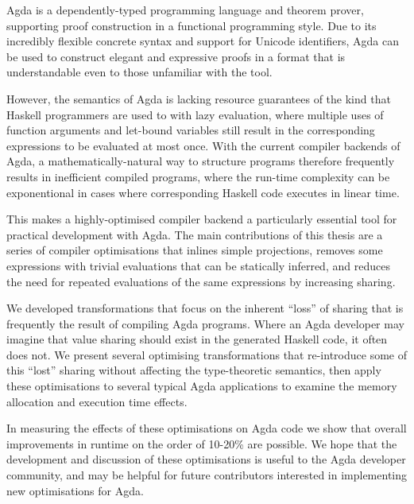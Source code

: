 Agda is a dependently-typed programming language and theorem prover,
supporting proof construction in a functional programming style.
Due to its incredibly flexible concrete syntax and support for Unicode
identifiers, Agda can be used to construct elegant and expressive
proofs in a format that is understandable even to those unfamiliar
with the tool.

However, the semantics of Agda is lacking resource guarantees
of the kind that Haskell programmers are used to with lazy evaluation,
where multiple uses of function arguments and let-bound variables
still result in the corresponding expressions to be evaluated at most
once.
With the current compiler backends of Agda,
a mathematically-natural way to structure programs
therefore frequently results in inefficient compiled programs,
where the run-time complexity can be exponentional in cases where
corresponding Haskell code executes in linear time.

This makes a highly-optimised compiler backend a particularly
essential tool for practical development with Agda.
The main contributions of this thesis are a series of compiler
optimisations that inlines simple projections, removes some
expressions with trivial evaluations that can be statically inferred,
and reduces the need for repeated evaluations of the same expressions
by increasing sharing.

We developed transformations that focus on the inherent ``loss'' of sharing
that is frequently the result of compiling Agda programs. Where an Agda
developer may imagine that value sharing should exist in the generated Haskell
code, it often does not.
We present several optimising transformations that re-introduce some of this
``lost'' sharing without affecting the type-theoretic semantics, then apply
these optimisations to several typical Agda applications to examine the
memory allocation and execution time effects.

In measuring the effects of these optimisations
on Agda code we show that overall improvements in runtime on the order
of 10-20\% are possible.
We hope that the development and discussion of these optimisations is
useful to the Agda developer community, and may be helpful for future
contributors interested in implementing new optimisations for Agda.
